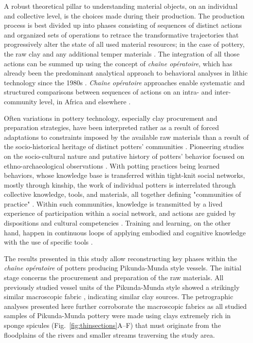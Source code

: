 \documentclass[smallextended,natbib]{svjour3}       %
\begin{document}
A robust theoretical pillar to understanding material objects, on an individual and collective level, is the choices made during their production. The production process is best divided up into phases consisting of sequences of distinct actions and organized sets of operations to retrace the transformative trajectories that progressively alter the state of all used material resources; in the case of pottery, the raw clay and any additional temper materials \citep[3--4]{Gosselain.2018}. The integration of all those actions can be summed up using the concept of \textit{chaîne opératoire}, which has already been the predominant analytical approach to behavioral analyses in lithic technology since the 1980s \citep{Tixier.1980,Tixier.1984,Pelegrin.1988}. \textit{Chaîne opératoire} approaches enable systematic and structured comparisons between sequences of actions on an intra- and inter-community level, in Africa \citep{Gosselain.1992,Gallay.1998,Gosselain.2002,LivingstoneSmith.2007a,Mayor.2011a,MMbogori.2015,Delvoye.2016,Delvoye.2022} and elsewhere \citep[see for example][]{Manem.2008,Ard.2014,Gomart.2014,Gaffney.2020,Heitz.2023}.

Often variations in pottery technology, especially clay procurement and preparation strategies, have been interpreted rather as a result of forced adaptations to constraints imposed by the available raw materials \citep{Braun.1983,Tite.1999,Rice.2015} than a result of the socio-historical heritage of distinct potters' communities \citep{McIntosh.1995,Gosselain.2010,Roux.2017,Gosselain.2018,Roux.2019}. Pioneering studies on the socio-cultural nature and putative history of potters' behavior focused on ethno-archaeological observations \citep{Lechtman.1977}. With potting practices being learned behaviors, whose knowledge base is transferred within tight-knit social networks, mostly through kinship, the work of individual potters is interrelated through collective knowledge, tools, and materials, all together defining "communities of practice" \citep{Wenger.1998,Lave.1991a,Lave.1991,Roddick.2016}. Within such communities, knowledge is transmitted by a lived experience of participation within a social network, and actions are guided by dispositions and cultural competencies \citep{Heitz.2017a}. Training and learning, on the other hand, happen in continuous loops of applying embodied and cognitive knowledge with the use of specific tools \citep{Kuijpers.2018a}.

The results presented in this study allow reconstructing key phases within the \textit{chaîne opératoire} of potters producing Pikunda-Munda style vessels. The initial stage concerns the procurement and preparation of the raw materials. All previously studied vessel units of the Pikunda-Munda style \citep[114--120]{Seidensticker.2021e} showed a strikingly similar macroscopic fabric \citep[62 Tab.~11,69 Tab.~12]{Seidensticker.2021e}, indicating similar clay sources. The petrographic analyses presented here further corroborate the macroscopic fabrics as all studied samples of Pikunda-Munda pottery were made using clays extremely rich in sponge spicules (Fig.~\ref{fig:thinsections}A--F) that must originate from the floodplains of the rivers and smaller streams traversing the study area.
\end{document}
